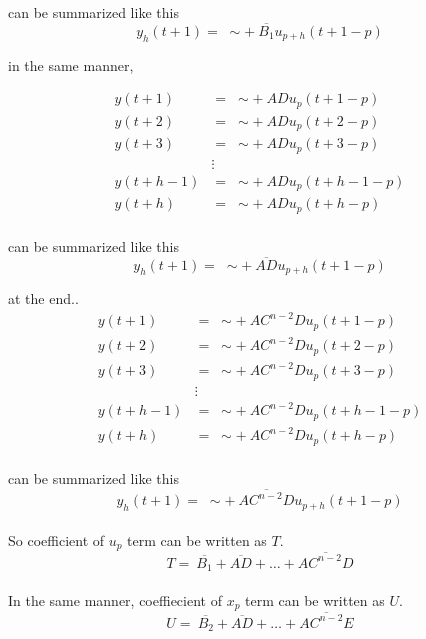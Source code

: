 \documentclass{article}
\begin{document}
can be summarized like this
\begin{equation*}
	y_h(t+1) =\;  \sim + \: \overline{B_1}u_{p+h}(t+1-p)
\end{equation*}

in the same manner, 

\begin{align*}
	y(t+1) & =\;  \sim + \:ADu_p(t+1-p)\\
	y(t+2) & =\;  \sim + \:ADu_p(t+2-p)\\
	y(t+3) & =\;  \sim + \:ADu_p(t+3-p)\\
		   & \vdots\\
	y(t+h-1) &= \;  \sim + \:ADu_p(t+h-1-p)\\
	y(t+h) &= \;  \sim + \:ADu_p(t+h-p)\\
\end{align*}

can be summarized like this
\begin{equation*}
	y_h(t+1) =\;  \sim + \: \overline{AD}u_{p+h}(t+1-p)
\end{equation*}


at the end..\\

\begin{align*}
	y(t+1) & =\;  \sim + \:AC^{n-2}Du_p(t+1-p)\\
	y(t+2) & =\;  \sim + \:AC^{n-2}Du_p(t+2-p)\\
	y(t+3) & =\;  \sim + \:AC^{n-2}Du_p(t+3-p)\\
		   & \vdots\\
	y(t+h-1) &= \;  \sim + \:AC^{n-2}Du_p(t+h-1-p)\\
	y(t+h) &= \;  \sim + \:AC^{n-2}Du_p(t+h-p)\\
\end{align*}

can be summarized like this
\begin{equation*}
	y_h(t+1) =\;  \sim + \: \overline{AC^{n-2}D}u_{p+h}(t+1-p)
\end{equation*}
\\

So coefficient of $u_p$ term can be written as $T$. 
\begin{equation*}
	T = \: \overline{B_1} +  \overline{AD} + \hdots +  \overline{AC^{n-2}D}
\end{equation*}
\\

In the same manner, coeffiecient of $x_p$ term can be written as $U$. 
\begin{equation*}
	U = \: \overline{B_2} +  \overline{AD} + \hdots +  \overline{AC^{n-2}E}
\end{equation*}
\\
\end{document}
